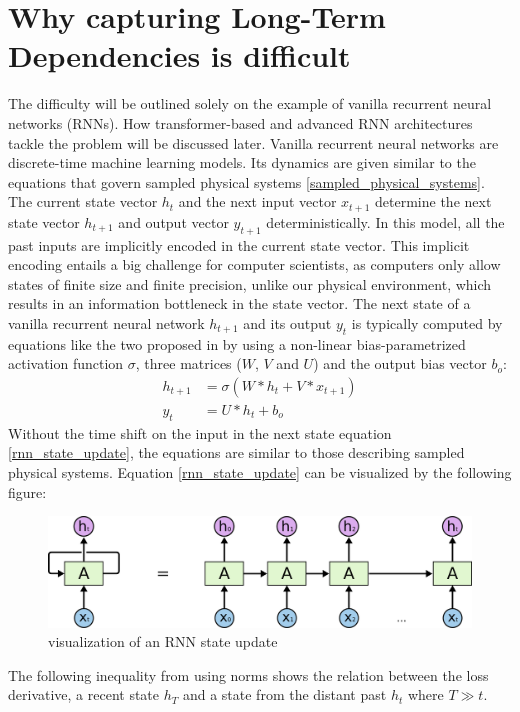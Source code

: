 \documentclass[draft,final]{vutinfth} %
\begin{document}
\section{Why capturing Long-Term Dependencies is difficult} \label{long_term_difficult}
The difficulty will be outlined solely on the example of vanilla recurrent neural networks (RNNs).
How transformer-based and advanced RNN architectures tackle the problem will be discussed later.
Vanilla recurrent neural networks are discrete-time machine learning models.
Its dynamics are given similar to the equations that govern sampled physical systems \ref{sampled_physical_systems}.
The current state vector $h_{t}$ and the next input vector $x_{t+1}$ determine the next state vector $h_{t+1}$ and output vector $y_{t+1}$ deterministically.
In this model, all the past inputs are implicitly encoded in the current state vector.
This implicit encoding entails a big challenge for computer scientists, as computers only allow states of finite size and finite precision, unlike our physical environment, which results in an information bottleneck in the state vector.
The next state of a vanilla recurrent neural network $h_{t+1}$ and its output $y_{t}$ is typically computed by equations like the two proposed in \cite[p. 2]{UnitaryRNNs} by using a non-linear bias-parametrized activation function $\sigma$, three matrices ($W$, $V$ and $U$) and the output bias vector $b_o$:
\begin{align}
\label{rnn_state_update}
h_{t+1} &= \sigma(W*h_t + V*x_{t+1}) \\
\label{rnn_output}
y_{t} &= U*h_{t} + b_o
\end{align}
Without the time shift on the input in the next state equation \ref{rnn_state_update}, the equations are similar to those describing sampled physical systems.
Equation \ref{rnn_state_update} can be visualized by the following figure:
\begin{figure}[H]
\centering{}
\includegraphics[width=0.8\linewidth]{graphics/rnn.png}
\caption{visualization of an RNN state update \cite{rnn_vis}}
\label{fig:rnn_vis}
\end{figure}
The following inequality from \cite[p. 2]{UnitaryRNNs} using norms shows the relation between the loss derivative, a recent state $h_T$ and a state from the distant past $h_t$ where $T \gg t$.
\end{document}
